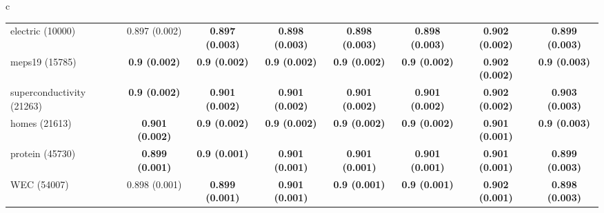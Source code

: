 \documentclass[border=6pt]{standalone}
\begin{document}
\begin{adjustbox}{max width=\linewidth}
\begin{tabular}{c}
\begin{tabular}{lccccccc}
electric (10000) & 0.897 (0.002) & \textbf{0.897 (0.003)} & \textbf{0.898 (0.003)} & \textbf{0.898 (0.003)} & \textbf{0.898 (0.003)} & \textbf{0.902 (0.002)} & \textbf{0.899 (0.003)}\\
meps19 (15785) & \textbf{0.9 (0.002)} & \textbf{0.9 (0.002)} & \textbf{0.9 (0.002)} & \textbf{0.9 (0.002)} & \textbf{0.9 (0.002)} & \textbf{0.902 (0.002)} & \textbf{0.9 (0.003)}\\
superconductivity (21263) & \textbf{0.9 (0.002)} & \textbf{0.901 (0.002)} & \textbf{0.901 (0.002)} & \textbf{0.901 (0.002)} & \textbf{0.901 (0.002)} & \textbf{0.902 (0.002)} & \textbf{0.903 (0.003)}\\
homes (21613) & \textbf{0.901 (0.002)} & \textbf{0.9 (0.002)} & \textbf{0.9 (0.002)} & \textbf{0.9 (0.002)} & \textbf{0.9 (0.002)} & \textbf{0.901 (0.001)} & \textbf{0.9 (0.003)}\\
protein (45730) & \textbf{0.899 (0.001)} & \textbf{0.9 (0.001)} & \textbf{0.901 (0.001)} & \textbf{0.901 (0.001)} & \textbf{0.901 (0.001)} & \textbf{0.901 (0.001)} & \textbf{0.899 (0.003)}\\
WEC (54007) & 0.898 (0.001) & \textbf{0.899 (0.001)} & \textbf{0.901 (0.001)} & \textbf{0.9 (0.001)} & \textbf{0.9 (0.001)} & \textbf{0.902 (0.001)} & \textbf{0.898 (0.003)}\\
\hline
\end{tabular}
\end{tabular}
\end{adjustbox}
\end{document}

